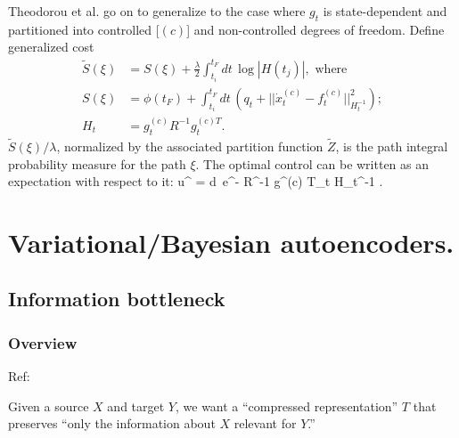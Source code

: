 \documentclass[notitlepage,openany,11pt]{report}
\DeclareMathOperator{\Tr}{Tr}
\theoremstyle{plain}%
\numberwithin{equation}{section}
\begin{document}
Theodorou et al. go on to generalize to the case where $g_{t}$ is state-dependent and partitioned into controlled [$(c)$] and non-controlled degrees of freedom. Define generalized cost
\begin{align*}
\widetilde{S}(\xi) &= S(\xi) + \frac{\lambda}{2} \int_{t_i}^{t_{F}} \! dt \, \log |H(t_{j})|, \text{ where} \\
S(\xi) &= \phi(t_{F}) + \int_{t_i}^{t_{F}} \! dt \, \left( q_{t} + || \dot{x}^{(c)}_{t} - f^{(c)}_{t} ||^{2}_{H_{t}^{-1}} \right); \\
H_{t} &= g^{(c)}_{t} R^{-1}g^{(c) T}_{t}.
\end{align*}
$\widetilde{S}(\xi)/\lambda$, normalized by the associated partition function $\widetilde{Z}$, is the path integral probability measure for the path $\xi$.  The optimal control can be written as an expectation with respect to it: 
\be
u^{\ast} =  \int \! d\xi \, e^{-} R^{-1} g^{(c) T}_{t} H_{t}^{-1} \left[ g^{(c)}_{t} dw_{t} - \frac{\lambda}{2} H_{t} \Tr \, (H_{t}^{-1} \partial_{x} H_{t}) \right].
\ee 



\chapter{Variational/Bayesian autoencoders.}

\section{Information bottleneck}

\subsection{Overview}
Ref: \cite{TishbyEtAl:99}

Given a source $X$ and target $Y$, we want a ``compressed representation'' $T$ that preserves ``only the information about $X$ relevant for $Y$.'' 
\end{document}
